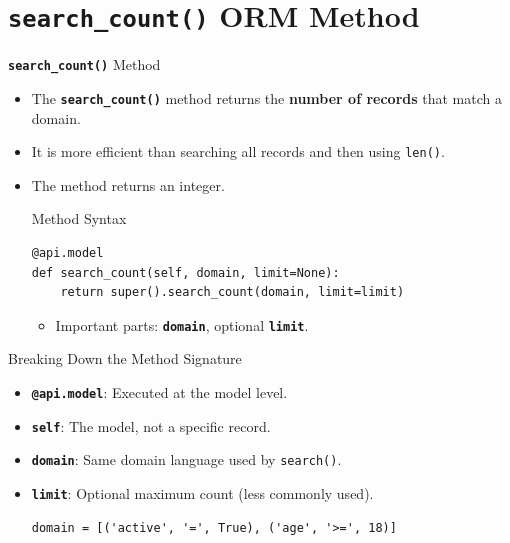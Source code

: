 
\section{\textbf{\texttt{search\_count()}} ORM Method}

\begin{frame}[fragile]{\textbf{\texttt{search\_count()}} Method}
	\begin{itemize}
		\item The \textbf{\texttt{search\_count()}} method returns the \textbf{number of records} that match a domain.
		\item It is more efficient than searching all records and then using \texttt{len()}.
		\item The method returns an integer.
\begin{block}{Method Syntax}
\begin{lstlisting}
@api.model
def search_count(self, domain, limit=None):
	return super().search_count(domain, limit=limit)
\end{lstlisting}
	\begin{itemize}
		\item Important parts: \textbf{\texttt{domain}}, optional \textbf{\texttt{limit}}.
	\end{itemize}
\end{block}
	\end{itemize}
\end{frame}

\begin{frame}[fragile]{Breaking Down the Method Signature}
	\begin{block}{}
		\begin{itemize}
			\item \textbf{\texttt{@api.model}}: Executed at the model level.
			\item \textbf{\texttt{self}}: The model, not a specific record.
			\item \textbf{\texttt{domain}}: Same domain language used by \texttt{search()}.
			\item \textbf{\texttt{limit}}: Optional maximum count (less commonly used).
\begin{lstlisting}
domain = [('active', '=', True), ('age', '>=', 18)]
\end{lstlisting}
		\end{itemize}
	\end{block}
\end{frame}

